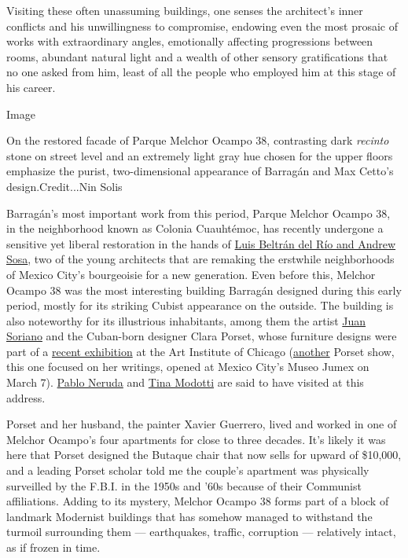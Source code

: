 Visiting these often unassuming buildings, one senses the architect's
inner conflicts and his unwillingness to compromise, endowing even the
most prosaic of works with extraordinary angles, emotionally affecting
progressions between rooms, abundant natural light and a wealth of other
sensory gratifications that no one asked from him, least of all the
people who employed him at this stage of his career.

Image

On the restored facade of Parque Melchor Ocampo 38, contrasting dark
\emph{recinto} stone on street level and an extremely light gray hue
chosen for the upper floors emphasize the purist, two-dimensional
appearance of Barragán and Max Cetto's design.Credit...Nin Solis

Barragán's most important work from this period, Parque Melchor Ocampo
38, in the neighborhood known as Colonia Cuauhtémoc, has recently
undergone a sensitive yet liberal restoration in the hands of
\href{http://www.vrtical.mx/about/}{Luis Beltrán del Río and Andrew
Sosa}, two of the young architects that are remaking the erstwhile
neighborhoods of Mexico City's bourgeoisie for a new generation. Even
before this, Melchor Ocampo 38 was the most interesting building
Barragán designed during this early period, mostly for its striking
Cubist appearance on the outside. The building is also noteworthy for
its illustrious inhabitants, among them the artist
\href{https://www.philamuseum.org/exhibitions/2008/285.html?page=2}{Juan
Soriano} and the Cuban-born designer Clara Porset, whose furniture
designs were part of a
\href{https://www.artic.edu/exhibitions/9198/in-a-cloud-in-a-wall-in-a-chair-six-modernists-in-mexico-at-midcentury}{recent
exhibition} at the Art Institute of Chicago
(\href{https://www.fundacionjumex.org/en/exposiciones/189-clara-porset-diseno-y-pensamiento}{another}
Porset show, this one focused on her writings, opened at Mexico City's
Museo Jumex on March 7).
\href{https://www.nytimes3xbfgragh.onion/2015/12/20/travel/pablo-neruda-chile.html}{Pablo
Neruda} and
\href{https://lens.blogs.nytimes3xbfgragh.onion/2017/08/24/tina-modotti-edward-weston-photography/}{Tina
Modotti} are said to have visited at this address.

Porset and her husband, the painter Xavier Guerrero, lived and worked in
one of Melchor Ocampo's four apartments for close to three decades. It's
likely it was here that Porset designed the Butaque chair that now sells
for upward of \$10,000, and a leading Porset scholar told me the
couple's apartment was physically surveilled by the F.B.I. in the 1950s
and '60s because of their Communist affiliations. Adding to its mystery,
Melchor Ocampo 38 forms part of a block of landmark Modernist buildings
that has somehow managed to withstand the turmoil surrounding them ---
earthquakes, traffic, corruption --- relatively intact, as if frozen in
time.

